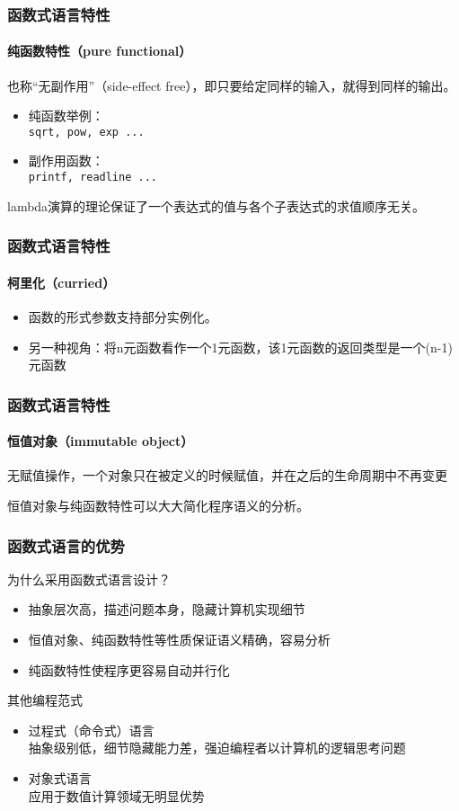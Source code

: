 \documentclass{beamer}
\begin{document}
\begin{frame}
  \frametitle{函数式语言特性}
  \framesubtitle{纯函数特性（pure functional）}
  也称“无副作用”（side-effect free），即只要给定同样的输入，就得到同样的输出。
  \begin{itemize}
    \item 纯函数举例：\\\texttt{sqrt, pow, exp ...}
    \item 副作用函数：\\\texttt{printf, readline ...}
  \end{itemize}
  \pause
  lambda演算的理论保证了一个表达式的值与各个子表达式的求值顺序无关。
\end{frame}

\begin{frame}
  \frametitle{函数式语言特性}
  \framesubtitle{柯里化（curried）}
  \begin{itemize}
    \item<1-> 函数的形式参数支持部分实例化。
      
    \item<2-> 另一种视角：将n元函数看作一个1元函数，该1元函数的返回类型是一个(n-1)元函数
      
  \end{itemize}
\end{frame}

\begin{frame}
  \frametitle{函数式语言特性}
  \framesubtitle{恒值对象（immutable object）}
  无赋值操作，一个对象只在被定义的时候赋值，并在之后的生命周期中不再变更
  
  \pause
  恒值对象与纯函数特性可以大大简化程序语义的分析。
\end{frame}

\begin{frame}
  \frametitle{函数式语言的优势}
  为什么采用函数式语言设计？
  \begin{itemize}
    \item 抽象层次高，描述问题本身，隐藏计算机实现细节
    \item 恒值对象、纯函数特性等性质保证语义精确，容易分析
    \item 纯函数特性使程序更容易自动并行化
  \end{itemize}
  \pause
  其他编程范式
  \begin{itemize}
    \item 过程式（命令式）语言\\
      抽象级别低，细节隐藏能力差，强迫编程者以计算机的逻辑思考问题
    \item 对象式语言\\
      应用于数值计算领域无明显优势
  \end{itemize}
\end{frame}
\end{document}
